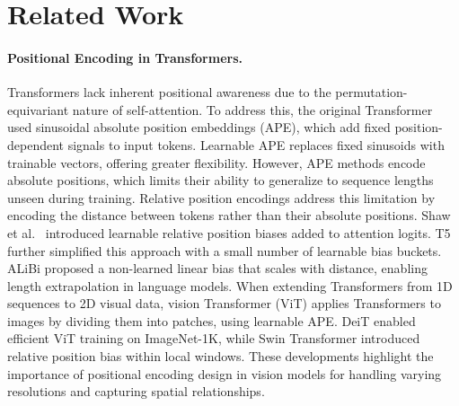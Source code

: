 
\section{Related Work}
\label{sec:related_work}

\paragraph{Positional Encoding in Transformers.}
Transformers \cite{vaswaniAttentionAllYou2023} lack inherent positional awareness due to the permutation-equivariant nature of self-attention. To address this, the original Transformer used sinusoidal absolute position embeddings 
(APE), which add fixed position-dependent signals to input tokens. Learnable APE \cite{devlinBERTPretrainingDeep2019} replaces fixed sinusoids 
with trainable vectors, offering greater flexibility. However, APE methods encode absolute positions, which limits their ability to generalize to 
sequence lengths unseen during training. Relative position encodings address this limitation by encoding the distance between tokens rather than 
their absolute positions. Shaw et al.~\cite{shawSelfAttentionRelativePosition2018} introduced learnable relative position biases added to 
attention logits. T5 \cite{raffelExploringLimitsTransfer2023} further simplified this approach with a small number of learnable bias buckets. 
ALiBi \cite{pressTrainShortTest2022} proposed a non-learned linear bias that scales with distance, enabling length extrapolation in language 
models. When extending Transformers from 1D sequences to 2D visual data, vision Transformer (ViT) \cite{dosovitskiyImageWorth16x162021} applies Transformers to images by dividing them into patches, using learnable APE. DeiT \cite{touvronTrainingDataefficientImage2021} enabled efficient ViT training on ImageNet-1K, while Swin Transformer \cite{liuSwinTransformerHierarchical2021} introduced relative position bias within local windows. These developments highlight the importance of positional encoding design in vision models for handling varying resolutions and capturing spatial relationships.

